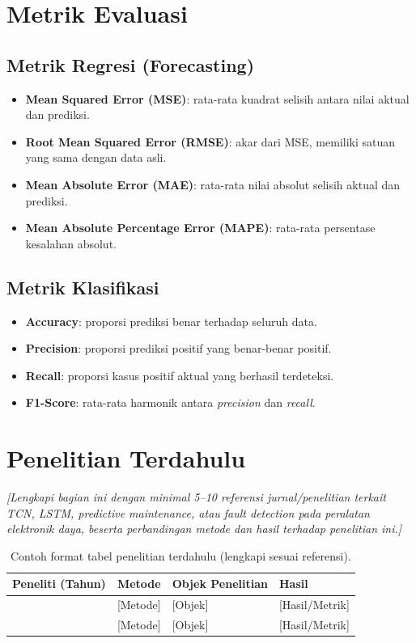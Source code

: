 \documentclass[12pt,a4paper]{report}
\begin{document}
\section{Metrik Evaluasi}
\subsection{Metrik Regresi (Forecasting)}
\begin{itemize}
    \item \textbf{Mean Squared Error (MSE)}: rata-rata kuadrat selisih antara nilai aktual dan prediksi.
    \item \textbf{Root Mean Squared Error (RMSE)}: akar dari MSE, memiliki satuan yang sama dengan data asli.
    \item \textbf{Mean Absolute Error (MAE)}: rata-rata nilai absolut selisih aktual dan prediksi.
    \item \textbf{Mean Absolute Percentage Error (MAPE)}: rata-rata persentase kesalahan absolut.
\end{itemize}

\subsection{Metrik Klasifikasi}
\begin{itemize}
    \item \textbf{Accuracy}: proporsi prediksi benar terhadap seluruh data.
    \item \textbf{Precision}: proporsi prediksi positif yang benar-benar positif.
    \item \textbf{Recall}: proporsi kasus positif aktual yang berhasil terdeteksi.
    \item \textbf{F1-Score}: rata-rata harmonik antara \textit{precision} dan \textit{recall}.
\end{itemize}

\section{Penelitian Terdahulu}
\noindent\textit{[Lengkapi bagian ini dengan minimal 5--10 referensi jurnal/penelitian terkait TCN, LSTM, predictive maintenance, atau fault detection pada peralatan elektronik daya, beserta perbandingan metode dan hasil terhadap penelitian ini.]}

\begin{table}[H]
    \centering
    \caption{Contoh format tabel penelitian terdahulu (lengkapi sesuai referensi).}
    \begin{tabular}{p{2.5cm}p{4cm}p{4cm}p{3cm}}
        \toprule
        \textbf{Peneliti (Tahun)} & \textbf{Metode} & \textbf{Objek Penelitian} & \textbf{Hasil} \\
        \midrule
        [Nama, Tahun] & [Metode] & [Objek] & [Hasil/Metrik] \\
        [Nama, Tahun] & [Metode] & [Objek] & [Hasil/Metrik] \\
        \bottomrule
    \end{tabular}
\end{table}
\end{document}

